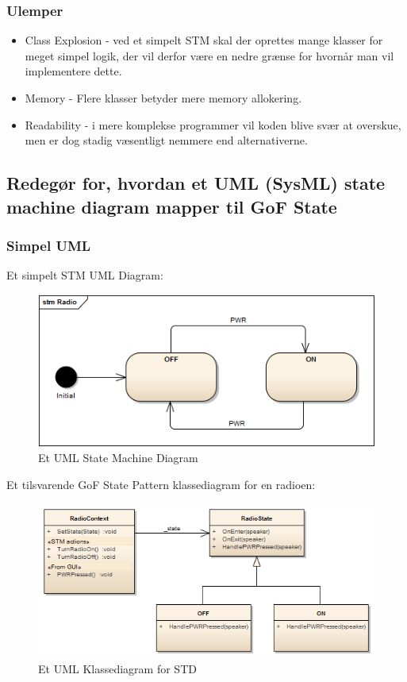 \subsubsection{Ulemper}
\begin{itemize}
	\item Class Explosion - ved et simpelt STM skal der oprettes mange klasser for meget simpel logik, der vil derfor være en nedre grænse for hvornår man vil implementere dette.
	\item Memory - Flere klasser betyder mere memory allokering.
	\item Readability - i mere komplekse programmer vil koden blive svær at overskue, men er dog stadig væsentligt nemmere end alternativerne.
\end{itemize}


\subsection{Redegør for, hvordan et UML (SysML) state machine diagram mapper til GoF State}
\subsubsection{Simpel UML}

Et simpelt STM UML Diagram:

\begin{figure}[H]
	\centering
	\includegraphics[width=0.7\linewidth]{figs/state/Radio_STM_Simpel}
	\caption{Et UML State Machine Diagram}
	\label{fig:UMLState}
\end{figure}

Et tilsvarende GoF State Pattern klassediagram for en radioen:

\begin{figure}[H]
	\centering
	\includegraphics[width=0.7\linewidth]{figs/state/Radio_StatePattern}
	\caption{Et UML Klassediagram for STD}
	\label{fig:UMLclassState}
\end{figure}

